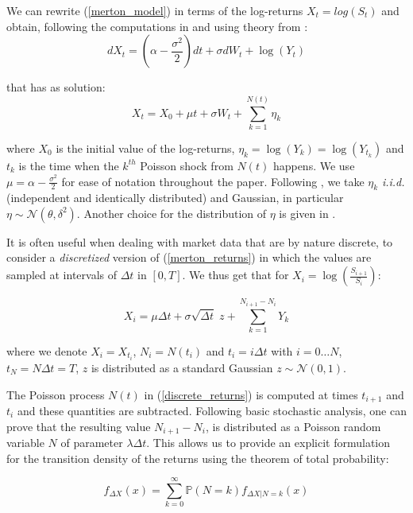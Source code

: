 We can rewrite (\ref{merton_model}) in terms of the log-returns $X_t = log(S_t)$ and obtain, following the computations in \cite{MARTIN2007} and using theory from \cite{TANKOV2015}:
\begin{equation}
dX_t = (\alpha - \frac{\sigma^2}{2})dt + \sigma dW_t + \log (Y_t)
\end{equation}

that has as solution:
\begin{equation}
\label{merton_returns}
X_t =X_0 +  \mu t + \sigma W_t + \sum_{k=1}^{N(t)} \eta_k
\end{equation}

where $X_0$ is the initial value of the log-returns, $\eta_k= \log(Y_k) = \log(Y_{t_k})$ and $t_k$ is the time when the $k^{th}$ Poisson shock from $N(t)$ happens. We use $\mu = \alpha - \frac{\sigma^2}{2} $ for ease of notation throughout the paper.
Following \cite{MERTON1976}, we take $\eta_k$ \textit{i.i.d.} (independent and identically distributed) and Gaussian, in particular $\eta \sim \mathcal{N}(\theta, \delta^2)$.
Another choice for the distribution of $\eta$ is given in \cite{KOU2002}. 


It is often useful when dealing with market data that are by nature discrete, to consider a \textit{discretized} version of (\ref{merton_returns}) in which the values are sampled at intervals of $\Delta t$ in $[0, T]$. We thus get that for $X_i = \log(\frac{S_{i+1}}{S_i})$:

\begin{equation}
\label{discrete_returns}
X_i =  \mu \Delta t + \sigma \sqrt{\Delta t} \; z +  \sum_{k=1}^{N_{i+1} - N_i} Y_k
\end{equation}

where we denote $X_i = X_{t_i}$, $N_i = N(t_i)$ and $t_i = i \Delta t$ with $i= 0 \dots N$, $t_N = N \Delta t= T$,  $z$ is distributed as a standard Gaussian $ z\sim \mathcal{N}(0,1)$.

The Poisson process $N(t)$ in (\ref{discrete_returns}) is computed at times $t_{i+1}$ and $t_i$ and these quantities are subtracted. Following basic stochastic analysis, one can prove that the resulting value $N_{i+1} - N_i$,  is distributed as a Poisson random variable $N$ of parameter $\lambda \Delta t$.
This allows us to provide an explicit formulation for the transition density of the returns using the theorem of total probability:

\begin{equation}
\label{transitional}
f_{\Delta X} (x) = \sum_{k=0}^{\infty} \mathbb{P}(N = k) f_{\Delta X | N = k}(x) 
\end{equation}

